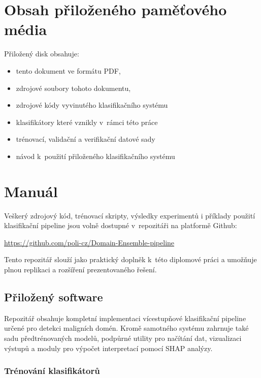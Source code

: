 \chapter{Obsah přiloženého paměťového média}
Přiložený disk obsahuje:
\begin{itemize}
    \item tento dokument ve formátu PDF,
    \item zdrojové soubory tohoto dokumentu,
    \item zdrojové kódy vyvinutého klasifikačního systému
    \item klasifikátory které vznikly v~rámci této práce
    \item trénovací, validační a verifikační datové sady
    \item návod k~použití přiloženého klasifikačního systému
\end{itemize}





\chapter{Manuál}

Veškerý zdrojový kód, trénovací skripty, výsledky experimentů i příklady použití klasifikační pipeline jsou volně dostupné v~repozitáři na platformě Github:

\begin{center}
\url{https://github.com/poli-cz/Domain-Ensemble-pipeline}
\end{center}

\noindent Tento repozitář slouží jako praktický doplněk k~této diplomové práci a umožňuje plnou replikaci a rozšíření prezentovaného řešení.

\section*{Přiložený software}

Repozitář obsahuje kompletní implementaci vícestupňové klasifikační pipeline určené pro detekci maligních domén. Kromě samotného systému zahrnuje také sadu předtrénovaných modelů, podpůrné utility pro načítání dat, vizualizaci výstupů a moduly pro výpočet interpretací pomocí SHAP analýzy.

\subsection*{Trénování klasifikátorů}

